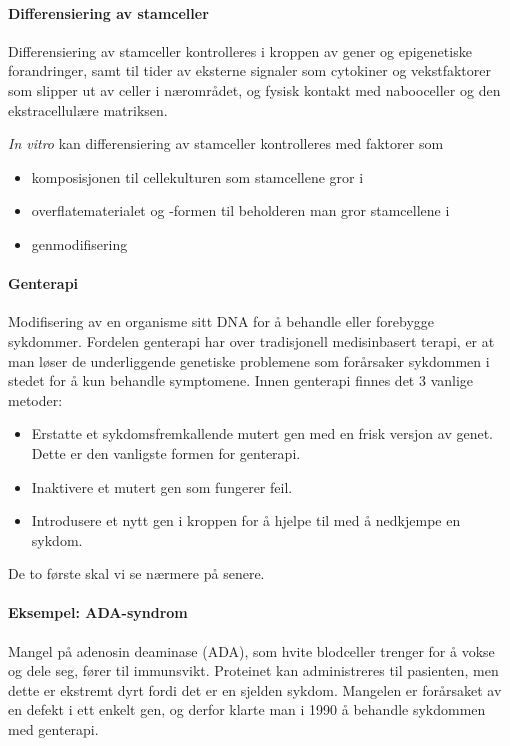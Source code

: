 \paragraph{Differensiering av stamceller} Differensiering av stamceller kontrolleres i kroppen av gener og epigenetiske forandringer, samt til tider av eksterne signaler som cytokiner og vekstfaktorer som slipper ut av celler i nærområdet, og fysisk kontakt med nabooceller og den ekstracellulære matriksen.

\emph{In vitro} kan differensiering av stamceller kontrolleres med faktorer som 
\begin{itemize}[nolistsep,noitemsep]
	\item komposisjonen til cellekulturen som stamcellene gror i
	\item overflatematerialet og -formen til beholderen man gror stamcellene i
	\item genmodifisering
\end{itemize}


\paragraph{Genterapi} Modifisering av en organisme sitt DNA for å behandle eller forebygge sykdommer. Fordelen genterapi har over tradisjonell medisinbasert terapi, er at man løser de underliggende genetiske problemene som forårsaker sykdommen i stedet for å kun behandle symptomene. Innen genterapi finnes det 3 vanlige metoder:
\begin{itemize}[nolistsep,noitemsep]
	\item Erstatte et sykdomsfremkallende mutert gen med en frisk versjon av genet. Dette er den vanligste formen for genterapi.
	\item Inaktivere et mutert gen som fungerer feil.
	\item Introdusere et nytt gen i kroppen for å hjelpe til med å nedkjempe en sykdom.
\end{itemize}
De to første skal vi se nærmere på senere.

\paragraph{Eksempel: ADA-syndrom} Mangel på adenosin deaminase (ADA), som hvite blodceller trenger for å vokse og dele seg, fører til immunsvikt. Proteinet kan administreres til pasienten, men dette er ekstremt dyrt fordi det er en sjelden sykdom. Mangelen er forårsaket av en defekt i ett enkelt gen, og derfor klarte man i 1990 å behandle sykdommen med genterapi.

